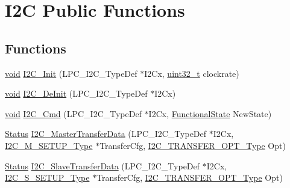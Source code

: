 \hypertarget{group___i2_c___public___functions}{}\section{I2C Public Functions}
\label{group___i2_c___public___functions}
\subsection*{Functions}
\begin{DoxyCompactItemize}
\item 
\hyperlink{usb__devapi_8h_afabf60e7f57651d6d595a02c75f07cd0}{void} \hyperlink{group___i2_c___public___functions_ga4f0c228696f1a8b60437241ba9af7455}{I2\+C\+\_\+\+Init} (L\+P\+C\+\_\+\+I2\+C\+\_\+\+Type\+Def $\ast$I2\+Cx, \hyperlink{_p_e___types_8h_a33594304e786b158f3fb30289278f5af}{uint32\+\_\+t} clockrate)
\item 
\hyperlink{usb__devapi_8h_afabf60e7f57651d6d595a02c75f07cd0}{void} \hyperlink{group___i2_c___public___functions_ga761d88cee2fa33f03e1c08c44057fc5b}{I2\+C\+\_\+\+De\+Init} (L\+P\+C\+\_\+\+I2\+C\+\_\+\+Type\+Def $\ast$I2\+Cx)
\item 
\hyperlink{usb__devapi_8h_afabf60e7f57651d6d595a02c75f07cd0}{void} \hyperlink{group___i2_c___public___functions_gae592e1754a5500b03a1bb92d30e04246}{I2\+C\+\_\+\+Cmd} (L\+P\+C\+\_\+\+I2\+C\+\_\+\+Type\+Def $\ast$I2\+Cx, \hyperlink{agilefox_2library_2inc_2stm32f10x__type_8h_ac9a7e9a35d2513ec15c3b537aaa4fba1}{Functional\+State} New\+State)
\item 
\hyperlink{group___l_p_c___types___public___types_ga67a0db04d321a74b7e7fcfd3f1a3f70b}{Status} \hyperlink{group___i2_c___public___functions_ga102947f62951ca9031674c3df8117352}{I2\+C\+\_\+\+Master\+Transfer\+Data} (L\+P\+C\+\_\+\+I2\+C\+\_\+\+Type\+Def $\ast$I2\+Cx, \hyperlink{struct_i2_c___m___s_e_t_u_p___type}{I2\+C\+\_\+\+M\+\_\+\+S\+E\+T\+U\+P\+\_\+\+Type} $\ast$Transfer\+Cfg, \hyperlink{group___i2_c___public___types_gacbdb9912dc18d79d425d9ac7e1333095}{I2\+C\+\_\+\+T\+R\+A\+N\+S\+F\+E\+R\+\_\+\+O\+P\+T\+\_\+\+Type} Opt)
\item 
\hyperlink{group___l_p_c___types___public___types_ga67a0db04d321a74b7e7fcfd3f1a3f70b}{Status} \hyperlink{group___i2_c___public___functions_gab855dcf9fa8a95da591c532dbb92af31}{I2\+C\+\_\+\+Slave\+Transfer\+Data} (L\+P\+C\+\_\+\+I2\+C\+\_\+\+Type\+Def $\ast$I2\+Cx, \hyperlink{struct_i2_c___s___s_e_t_u_p___type}{I2\+C\+\_\+\+S\+\_\+\+S\+E\+T\+U\+P\+\_\+\+Type} $\ast$Transfer\+Cfg, \hyperlink{group___i2_c___public___types_gacbdb9912dc18d79d425d9ac7e1333095}{I2\+C\+\_\+\+T\+R\+A\+N\+S\+F\+E\+R\+\_\+\+O\+P\+T\+\_\+\+Type} Opt)

\end{DoxyCompactItemize}

